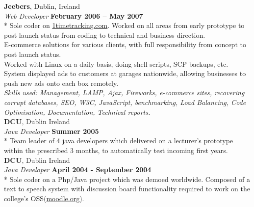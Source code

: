 \documentclass[margin,line]{resume}
\begin{document}
\begin{resume}
    \textbf{Jeebers}, Dublin, Ireland \vspace{2mm}\\\vspace{1mm}%
    \textsl{Web Developer} \hfill \textbf{February 2006 -- May 2007}\\*
    Sole coder on \href{http://1timetracking.com}{1timetracking.com}. Worked on all areas from early prototype to post launch status from coding to technical and business direction. \\%
    E-commerce solutions for various clients, with full responsibility from concept to post launch status. \vspace{1mm}\\%
    Worked with Linux on a daily basis, doing shell scripts, SCP backups, etc. System displayed ads to customers at garages nationwide, allowing businesses to push new ads onto each box remotely.\vspace{1mm}\\%
    \textsl{Skills used: Management, LAMP, Ajax, Fireworks, e-commerce sites, recovering corrupt databases, SEO, W3C, JavaScript, benchmarking, Load Balancing, Code Optimisation, Documentation, Technical reports.}\vspace{1mm}\\%


    \textbf{DCU}, Dublin Ireland \vspace{2mm}\\\vspace{1mm}%
    \textsl{Java Developer} \hfill \textbf{Summer 2005}\\*
    Team leader of 4 java developers which delivered on a lecturer's prototype within the prescribed 3 months, to automatically test incoming first years. \vspace{1mm}\\%
  
    \textbf{DCU}, Dublin Ireland \vspace{2mm}\\\vspace{1mm}%
    \textsl{Java Developer} \hfill \textbf{April 2004 - September 2004}\\*
    Sole coder on a Php/Java project which was demoed worldwide. Composed of a text to speech system with discussion board functionality required to work on the college's OSS(\href{http://moodle.org}{moodle.org}).


\end{resume}
\end{document}
